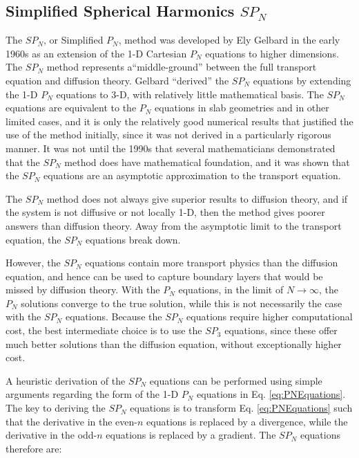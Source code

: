 \documentclass[10pt]{article}
\begin{document}
\begin{flushleft}
\subsection{Simplified Spherical Harmonics \(SP_N\)}
\label{sec:SPN}

The \(SP_N\), or Simplified \(P_N\), method was developed by Ely Gelbard in the early 1960s as an extension of the 1-D Cartesian \(P_N\) equations to higher dimensions. The \(SP_N\) method represents a``middle-ground'' between the full transport equation and diffusion theory. Gelbard ``derived'' the \(SP_N\) equations by extending the 1-D \(P_N\) equations to 3-D, with relatively little mathematical basis. The \(SP_N\) equations are equivalent to the \(P_N\) equations in slab geometries and in other limited cases, and it is only the relatively good numerical results that justified the use of the method initially, since it was not derived in a particularly rigorous manner. It was not until the 1990s that several mathematicians demonstrated that the \(SP_N\) method does have mathematical foundation, and it was shown that the \(SP_N\) equations are an asymptotic approximation to the transport equation. 

The \(SP_N\) method does not always give superior results to diffusion theory, and if the system is not diffusive or not locally 1-D, then the method gives poorer answers than diffusion theory. Away from the asymptotic limit to the transport equation, the \(SP_N\) equations break down. 

However, the \(SP_N\) equations contain more transport physics than the diffusion equation, and hence can be used to capture boundary layers that would be missed by diffusion theory. With the \(P_N\) equations, in the limit of \(N\rightarrow\infty\), the \(P_N\) solutions converge to the true solution, while this is not necessarily the case with the \(SP_N\) equations. Because the \(SP_N\) equations require higher computational cost, the best intermediate choice is to use the \(SP_3\) equations, since these offer much better solutions than the diffusion equation, without exceptionally higher cost.

A heuristic derivation of the \(SP_N\) equations can be performed using simple arguments regarding the form of the 1-D \(P_N\) equations in Eq. \eqref{eq:PNEquations}. The key to deriving the \(SP_N\) equations is to transform Eq. \eqref{eq:PNEquations} such that the derivative in the even-\(n\) equations is replaced by a divergence, while the derivative in the odd-\(n\) equations is replaced by a gradient. The \(SP_N\) equations therefore are:


\end{flushleft}
\end{document}
